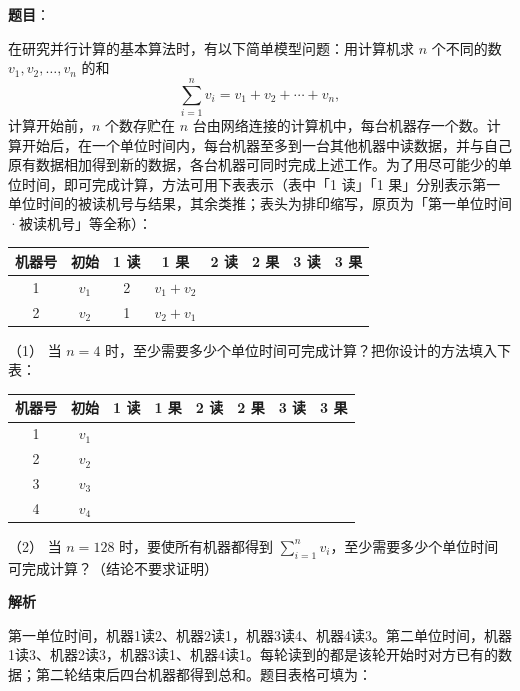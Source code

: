 \begin{answer}

\textbf{题目}：

在研究并行计算的基本算法时，有以下简单模型问题：用计算机求 \(n\) 个不同的数 \(v_1,v_2,\ldots,v_n\) 的和
\nopagebreak[4]
\[
\sum_{i=1}^{n}v_i=v_1+v_2+\cdots+v_n,
\]
计算开始前，\(n\) 个数存贮在 \(n\) 台由网络连接的计算机中，每台机器存一个数。计算开始后，在一个单位时间内，每台机器至多到一台其他机器中读数据，并与自己原有数据相加得到新的数据，各台机器可同时完成上述工作。为了用尽可能少的单位时间，即可完成计算，方法可用下表表示（表中「1 读」「1 果」分别表示第一单位时间的被读机号与结果，其余类推；表头为排印缩写，原页为「第一单位时间·被读机号」等全称）：

\begin{center}
\begingroup\setlength{\tabcolsep}{4pt}
\begin{tabular}{cccccccc}
\toprule
机器号 & 初始 & 1 读 & 1 果 & 2 读 & 2 果 & 3 读 & 3 果 \\
\midrule
1 & \(v_1\) & 2 & \(v_1+v_2\) &  &  &  &  \\
2 & \(v_2\) & 1 & \(v_2+v_1\) &  &  &  &  \\
\bottomrule
\end{tabular}
\endgroup
\end{center}

（1） 当 \(n=4\) 时，至少需要多少个单位时间可完成计算？把你设计的方法填入下表：

\begin{center}
\begingroup\setlength{\tabcolsep}{4pt}
\begin{tabular}{cccccccc}
\toprule
机器号 & 初始 & 1 读 & 1 果 & 2 读 & 2 果 & 3 读 & 3 果 \\
\midrule
1 & \(v_1\) &  &  &  &  &  &  \\
2 & \(v_2\) &  &  &  &  &  &  \\
3 & \(v_3\) &  &  &  &  &  &  \\
4 & \(v_4\) &  &  &  &  &  &  \\
\bottomrule
\end{tabular}
\endgroup
\end{center}

（2） 当 \(n=128\) 时，要使所有机器都得到 \(\displaystyle\sum_{i=1}^{n}v_i\)，至少需要多少个单位时间可完成计算？（结论不要求证明）

\textbf{解析}


第一单位时间，机器1读2、机器2读1，机器3读4、机器4读3。第二单位时间，机器1读3、机器2读3，机器3读1、机器4读1。每轮读到的都是该轮开始时对方已有的数据；第二轮结束后四台机器都得到总和。题目表格可填为：


\end{answer}
